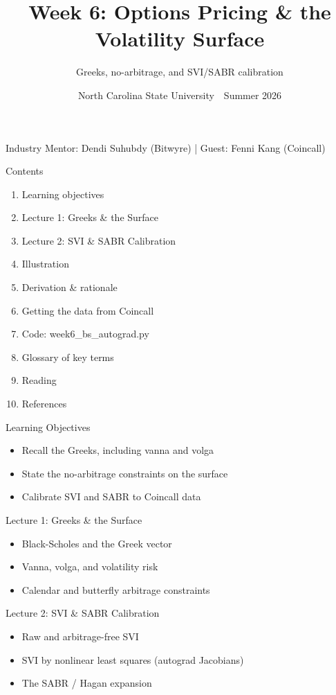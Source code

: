 \documentclass[aspectratio=169,10pt]{beamer}
\title{Week 6: Options Pricing \& the Volatility Surface}
\subtitle{Greeks, no-arbitrage, and SVI/SABR calibration}
\date{North Carolina State University \,\textbar\, Summer 2026}
\begin{document}
\begin{frame}[plain]\titlepage\begin{center}\tiny Industry Mentor: Dendi Suhubdy (Bitwyre)  |  Guest: Fenni Kang (Coincall)\end{center}\end{frame}
\begin{frame}{Contents}
\small\begin{enumerate}\setlength{\itemsep}{3pt}
  \item Learning objectives
  \item Lecture 1: Greeks \& the Surface
  \item Lecture 2: SVI \& SABR Calibration
  \item Illustration
  \item Derivation \& rationale
  \item Getting the data from Coincall
  \item Code: week6\_bs\_autograd.py
  \item Glossary of key terms
  \item Reading
  \item References
\end{enumerate}
\end{frame}

\begin{frame}{Learning Objectives}
\begin{itemize}
  \item Recall the Greeks, including vanna and volga
  \item State the no-arbitrage constraints on the surface
  \item Calibrate SVI and SABR to Coincall data
\end{itemize}
\end{frame}

\begin{frame}{Lecture 1: Greeks \& the Surface}
\begin{itemize}
  \item Black-Scholes and the Greek vector
  \item Vanna, volga, and volatility risk
  \item Calendar and butterfly arbitrage constraints
\end{itemize}
\end{frame}

\begin{frame}{Lecture 2: SVI \& SABR Calibration}
\begin{itemize}
  \item Raw and arbitrage-free SVI
  \item SVI by nonlinear least squares (autograd Jacobians)
  \item The SABR / Hagan expansion
\end{itemize}
\end{frame}
\end{document}
